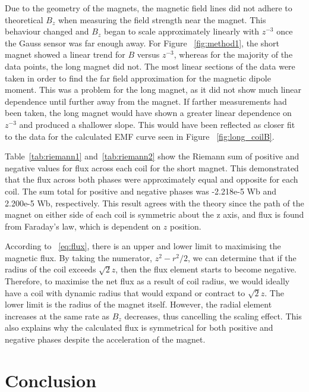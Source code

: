 Due to the geometry of the magnets, the magnetic field lines did not adhere to theoretical $B_z$ when measuring the
field strength near the magnet.
This behaviour changed and $B_z$ began to scale approximately linearly with $z^{-3}$ once the Gauss sensor was far
enough away.
For Figure ~\ref{fig:method1}, the short magnet showed a linear trend for $B$ versus $z^{-3}$, whereas for the majority
of the data points, the
long magnet did not.
The most linear sections of the data were taken in order to find the far field approximation for the magnetic dipole
moment.
This was a problem for the long magnet, as it did not show much linear dependence until further away from the
magnet.
If farther measurements had been taken, the long magnet would have shown a greater linear dependence on $z^{-3}$ and
produced a shallower slope.
This would have been reflected as closer fit to the data for the calculated EMF curve seen in Figure ~\ref{fig:long_coilB}.

\bigskip

Table~\ref{tab:riemann1} and~\ref{tab:riemann2} show the Riemann sum of positive and negative values for
flux across each coil for the short magnet.
This demonstrated that the flux across both phases were approximately equal and opposite for each coil.
The sum total for positive and negative phases was -2.218e-5 Wb and 2.200e-5 Wb, respectively.
This result agrees with the theory since the path of the magnet on either side of each coil is symmetric about the z
axis, and flux is found from Faraday's law, which is dependent on $z$ position.

According to ~\eqref{eq:flux}, there is an upper and lower limit to maximising the magnetic flux.
By taking the numerator, $z^2 - r^2 / 2$, we can determine that if the radius of the coil exceeds $\sqrt{2}z$, then
the flux element starts to become negative.
Therefore, to maximise the net flux as a result of coil radius, we would ideally have a coil with dynamic radius
that would expand or contract to $\sqrt{2}z$.
The lower limit is the radius of the magnet itself.
However, the radial element increases at the same rate as $B_z$ decreases, thus cancelling the scaling effect.
This also explains why the calculated flux is symmetrical for both positive and negative phases despite the
acceleration of the
magnet.

\section{Conclusion}\label{sec:conclusion}

